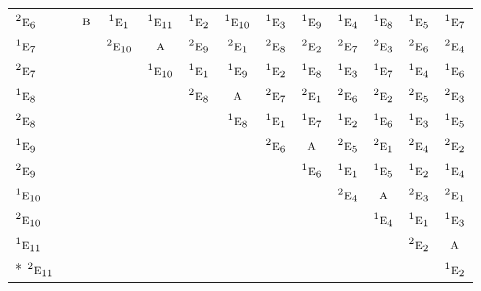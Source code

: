 \documentclass[10pt,a4paper]{article}
\numberwithin{equation}{section}
\newcommand{\irr}[1]{\text{\normalfont\scshape #1}}
\newcommand{\conjpair}[1]{{}^{#1}}
\begin{document}
{\begin{longtable}{@{}lcccccccccccc@{}}
$\conjpair{2}\irr{e}_{6}$ &  & $\irr{b}$ & $\conjpair{1}\irr{e}_{1}$ & $\conjpair{1}\irr{e}_{11}$ & $\conjpair{1}\irr{e}_{2}$ & $\conjpair{1}\irr{e}_{10}$ & $\conjpair{1}\irr{e}_{3}$ & $\conjpair{1}\irr{e}_{9}$ & $\conjpair{1}\irr{e}_{4}$ & $\conjpair{1}\irr{e}_{8}$ & $\conjpair{1}\irr{e}_{5}$ & $\conjpair{1}\irr{e}_{7}$\\
$\conjpair{1}\irr{e}_{7}$ &  &  & $\conjpair{2}\irr{e}_{10}$ & $\irr{a}$ & $\conjpair{2}\irr{e}_{9}$ & $\conjpair{2}\irr{e}_{1}$ & $\conjpair{2}\irr{e}_{8}$ & $\conjpair{2}\irr{e}_{2}$ & $\conjpair{2}\irr{e}_{7}$ & $\conjpair{2}\irr{e}_{3}$ & $\conjpair{2}\irr{e}_{6}$ & $\conjpair{2}\irr{e}_{4}$\\
$\conjpair{2}\irr{e}_{7}$ &  &  &  & $\conjpair{1}\irr{e}_{10}$ & $\conjpair{1}\irr{e}_{1}$ & $\conjpair{1}\irr{e}_{9}$ & $\conjpair{1}\irr{e}_{2}$ & $\conjpair{1}\irr{e}_{8}$ & $\conjpair{1}\irr{e}_{3}$ & $\conjpair{1}\irr{e}_{7}$ & $\conjpair{1}\irr{e}_{4}$ & $\conjpair{1}\irr{e}_{6}$\\
$\conjpair{1}\irr{e}_{8}$ &  &  &  &  & $\conjpair{2}\irr{e}_{8}$ & $\irr{a}$ & $\conjpair{2}\irr{e}_{7}$ & $\conjpair{2}\irr{e}_{1}$ & $\conjpair{2}\irr{e}_{6}$ & $\conjpair{2}\irr{e}_{2}$ & $\conjpair{2}\irr{e}_{5}$ & $\conjpair{2}\irr{e}_{3}$\\
$\conjpair{2}\irr{e}_{8}$ &  &  &  &  &  & $\conjpair{1}\irr{e}_{8}$ & $\conjpair{1}\irr{e}_{1}$ & $\conjpair{1}\irr{e}_{7}$ & $\conjpair{1}\irr{e}_{2}$ & $\conjpair{1}\irr{e}_{6}$ & $\conjpair{1}\irr{e}_{3}$ & $\conjpair{1}\irr{e}_{5}$\\
$\conjpair{1}\irr{e}_{9}$ &  &  &  &  &  &  & $\conjpair{2}\irr{e}_{6}$ & $\irr{a}$ & $\conjpair{2}\irr{e}_{5}$ & $\conjpair{2}\irr{e}_{1}$ & $\conjpair{2}\irr{e}_{4}$ & $\conjpair{2}\irr{e}_{2}$\\
$\conjpair{2}\irr{e}_{9}$ &  &  &  &  &  &  &  & $\conjpair{1}\irr{e}_{6}$ & $\conjpair{1}\irr{e}_{1}$ & $\conjpair{1}\irr{e}_{5}$ & $\conjpair{1}\irr{e}_{2}$ & $\conjpair{1}\irr{e}_{4}$\\
$\conjpair{1}\irr{e}_{10}$ &  &  &  &  &  &  &  &  & $\conjpair{2}\irr{e}_{4}$ & $\irr{a}$ & $\conjpair{2}\irr{e}_{3}$ & $\conjpair{2}\irr{e}_{1}$\\
$\conjpair{2}\irr{e}_{10}$ &  &  &  &  &  &  &  &  &  & $\conjpair{1}\irr{e}_{4}$ & $\conjpair{1}\irr{e}_{1}$ & $\conjpair{1}\irr{e}_{3}$\\
$\conjpair{1}\irr{e}_{11}$ &  &  &  &  &  &  &  &  &  &  & $\conjpair{2}\irr{e}_{2}$ & $\irr{a}$\\*
$\conjpair{2}\irr{e}_{11}$ &  &  &  &  &  &  &  &  &  &  &  & $\conjpair{1}\irr{e}_{2}$\\
\bottomrule\end{longtable}}
\end{document}
